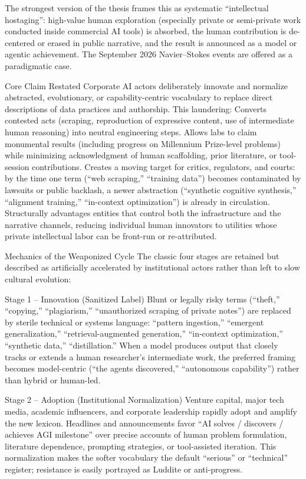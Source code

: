 The strongest version of the thesis frames this as systematic “intellectual hostaging”: high-value human exploration (especially private or semi-private work conducted inside commercial AI tools) is absorbed, the human contribution is de-centered or erased in public narrative, and the result is announced as a model or agentic achievement. The September 2026 Navier–Stokes events are offered as a paradigmatic case.

Core Claim Restated
Corporate AI actors deliberately innovate and normalize abstracted, evolutionary, or capability-centric vocabulary to replace direct descriptions of data practices and authorship. This laundering:
Converts contested acts (scraping, reproduction of expressive content, use of intermediate human reasoning) into neutral engineering steps.
Allows labs to claim monumental results (including progress on Millennium Prize-level problems) while minimizing acknowledgment of human scaffolding, prior literature, or tool-session contributions.
Creates a moving target for critics, regulators, and courts: by the time one term (“web scraping,” “training data”) becomes contaminated by lawsuits or public backlash, a newer abstraction (“synthetic cognitive synthesis,” “alignment training,” “in-context optimization”) is already in circulation.
Structurally advantages entities that control both the infrastructure and the narrative channels, reducing individual human innovators to utilities whose private intellectual labor can be front-run or re-attributed.

Mechanics of the Weaponized Cycle
The classic four stages are retained but described as artificially accelerated by institutional actors rather than left to slow cultural evolution:

Stage 1 – Innovation (Sanitized Label)  
Blunt or legally risky terms (“theft,” “copying,” “plagiarism,” “unauthorized scraping of private notes”) are replaced by sterile technical or systems language: “pattern ingestion,” “emergent generalization,” “retrieval-augmented generation,” “in-context optimization,” “synthetic data,” “distillation.” When a model produces output that closely tracks or extends a human researcher’s intermediate work, the preferred framing becomes model-centric (“the agents discovered,” “autonomous capability”) rather than hybrid or human-led.

Stage 2 – Adoption (Institutional Normalization)  
Venture capital, major tech media, academic influencers, and corporate leadership rapidly adopt and amplify the new lexicon. Headlines and announcements favor “AI solves / discovers / achieves AGI milestone” over precise accounts of human problem formulation, literature dependence, prompting strategies, or tool-assisted iteration. This normalization makes the softer vocabulary the default “serious” or “technical” register; resistance is easily portrayed as Luddite or anti-progress.

